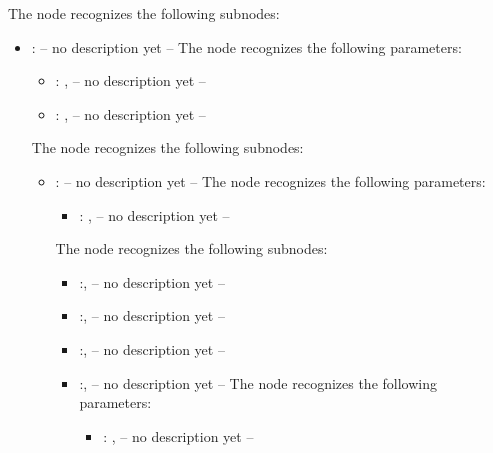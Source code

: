   The  node recognizes the following subnodes:
  \begin{itemize}
    \item {}:
      -- no description yet --
      The  node recognizes the following parameters:
        \begin{itemize}
          \item {}: , 
            -- no description yet --
          \item {}: , 
            -- no description yet --
      \end{itemize}

      The  node recognizes the following subnodes:
      \begin{itemize}
        \item {}:
          -- no description yet --
          The  node recognizes the following parameters:
            \begin{itemize}
              \item {}: , 
                -- no description yet --
          \end{itemize}

          The  node recognizes the following subnodes:
          \begin{itemize}
            \item {}:, 
              -- no description yet --

            \item {}:, 
              -- no description yet --

            \item {}:, 
              -- no description yet --

            \item {}:, 
              -- no description yet --
              The  node recognizes the following parameters:
                \begin{itemize}
                  \item {}: , 
                    -- no description yet --
              \end{itemize}


\end{itemize}
\end{itemize}
\end{itemize}
